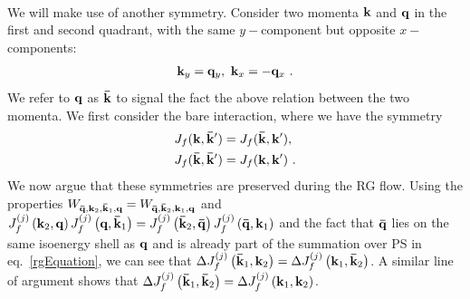 \documentclass[%
reprint,
superscriptaddress,
groupedaddress,
superscriptaddress,
onecolumn,
10pt
]{revtex4-2}
\begin{document}
\par{}\\
We will make use of another symmetry. Consider two momenta \({\bf k}\) and \({\bf q}\) in the first and second quadrant, with the same \(y-\)component but opposite \(x-\)components:
\begin{equation}\begin{aligned}
	{\bf k}_y = {\bf q}_y, ~ {\bf k}_x = -{\bf q}_x~.
\end{aligned}\end{equation}
We refer to \({\bf q}\) as \({\bf \bar k}\) to signal the fact the above relation between the two momenta. We first consider the bare interaction, where we have the symmetry
\begin{equation}\begin{aligned}\label{adjacent}
	J_f({\bf k}, {\bf \bar k}^\prime) = J_f({\bf \bar k}, {\bf k}^\prime),~\\
	J_f({\bf \bar k}, {\bf \bar k}^\prime) = J_f({\bf k}, {\bf k}^\prime)~.
\end{aligned}\end{equation}
We now argue that these symmetries are preserved during the RG flow. Using the properties \(W_{{\bf \bar q}, {\bf k}_2, {\bf \bar k}_1, {\bf q}} = W_{{\bf \bar q}, {\bf \bar k}_2, {\bf k}_1, {\bf q}}\) and  \(J_f^{(j)}\left({\bf k}_2,{\bf q}\right) J_f^{(j)}\left({\bf q},{\bf \bar k}_1\right) = J_f^{(j)}\left({\bf \bar k}_2,{\bf \bar q}\right) J_f^{(j)}\left({\bf \bar q},{\bf k}_1\right)\) and the fact that \({\bf \bar q}\) lies on the same isoenergy shell as \({\bf q}\) and is already part of the summation over PS in eq.~\ref{rgEquation}, we can see that \(\Delta J_f^{(j)}\left({\bf \bar k}_1, {\bf k}_2\right) = \Delta J_f^{(j)}\left({\bf k}_1, {\bf \bar k}_2\right)\). A similar line of argument shows that \(\Delta J_f^{(j)}\left({\bf \bar k}_1, {\bf \bar k}_2\right) = \Delta J_f^{(j)}\left({\bf k}_1, {\bf k}_2\right)\).
\end{document}
